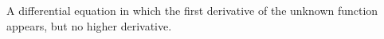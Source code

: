 A differential equation in which the first derivative of the unknown function appears,
but no higher derivative.